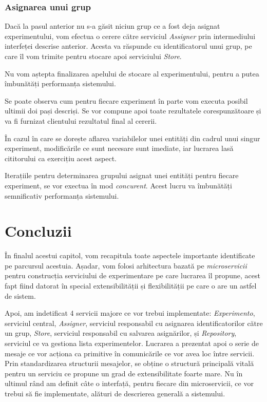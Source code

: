 \subsubsection{Asignarea unui grup}

Dacă la pasul anterior nu s-a găsit niciun grup ce a fost deja asignat experimentului, vom efectua o cerere către serviciul \textit{Assigner} prin intermediului interfeței descrise anterior. Acesta va răspunde cu identificatorul unui grup, pe care îl vom trimite pentru stocare apoi serviciului \textit{Store}. 

\begin{remark}
	Nu vom aștepta finalizarea apelului de stocare al experimentului, pentru a putea îmbunătăți performanța sistemului.
\end{remark}

Se poate observa cum pentru fiecare experiment în parte vom executa posibil ultimii doi pași descriși. Se vor compune apoi toate rezultatele corespunzătoare și va fi furnizat clientului rezultatul final al cererii.

În cazul în care se dorește aflarea variabilelor unei entități din cadrul unui singur experiment, modificările ce sunt necesare sunt imediate, iar lucrarea lasă cititorului ca exercițiu acest aspect.

\begin{remark}
	Iterațiile pentru determinarea grupului asignat unei entități pentru fiecare experiment, se vor exectua în mod \textit{concurent}. Acest lucru va îmbunătăți semnificativ performanța sistemului.
\end{remark}

\section{Concluzii}

În finalul acestui capitol, vom recapitula toate aspectele importante identificate pe parcursul acestuia. Așadar, vom folosi arhitectura bazată pe \textit{microservicii} pentru construcția serviciului de experimentare pe care lucrarea îl propune, acest fapt fiind datorat în special extensibilității și flexibilității pe care o are un astfel de sistem.

Apoi, am indetificat 4 servicii majore ce vor trebui implementate: \textit{Experimento}, serviciul central, \textit{Assigner}, serviciul responsabil cu asignarea identificatorilor către un grup, \textit{Store}, serviciul responsabil cu salvarea asignărilor, și \textit{Repository}, serviciul ce va gestiona lista experimentelor. Lucrarea a prezentat apoi o serie de mesaje ce vor acționa ca primitive în comunicările ce vor avea loc între servicii. Prin standardizarea structurii mesajelor, se obține o structură principală vitală pentru un serviciu ce propune un grad de extensibilitate foarte mare. Nu în ultimul rând am definit câte o interfață, pentru fiecare din microservicii, ce vor trebui să fie implementate, alături de descrierea generală a sistemului. 

